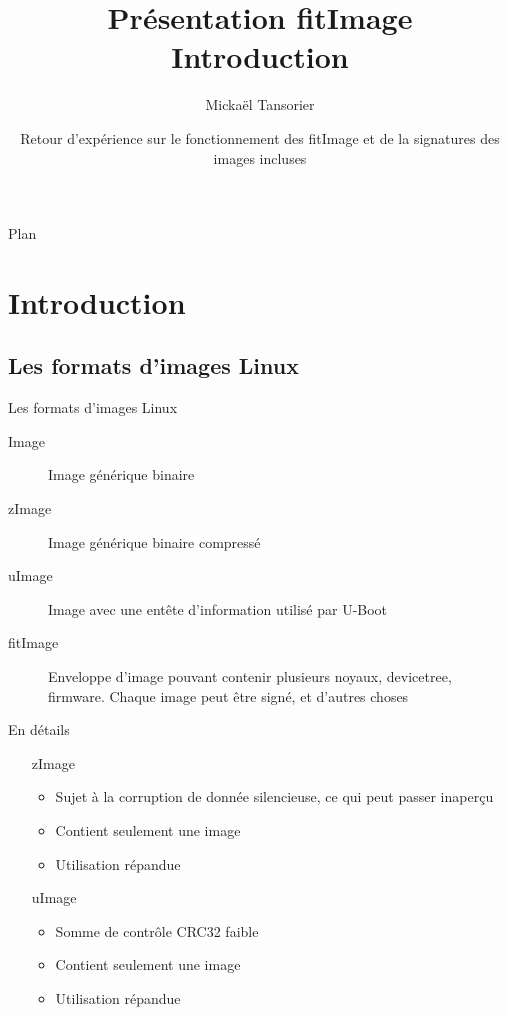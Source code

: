 \documentclass[aspectratio=169]{beamer}
\title[U-Boot]{Présentation fitImage \\ \textbf{Introduction}}
\author[Mickaël Tansorier]{Mickaël Tansorier}
\date[Août 2018]{Retour d'expérience sur le fonctionnement des fitImage et \newline de la signatures des images incluses}
\begin{document}

\begin{frame}
\titlepage
\end{frame}



\begin{frame}{Plan}
\tableofcontents[hideallsubsections]
\end{frame}

\section{Introduction}

\subsection{Les formats d'images Linux}

\begin{frame}
\begin{center}
\huge{Les formats d'images Linux}
\end{center}
\end{frame}

\begin{frame}
\begin{description}
	\item[Image] Image générique binaire
	\item[zImage] Image générique binaire compressé
	\item[uImage] Image avec une entête d'information utilisé par U-Boot
	\item[fitImage] Enveloppe d'image pouvant contenir plusieurs noyaux, devicetree, firmware. Chaque image peut être signé, et d'autres choses
\end{description}
\end{frame}

\begin{frame}{En détails}
\begin{itemize}
	\item [zImage]
	\begin{itemize}
	 	\item Sujet à la corruption de donnée silencieuse, ce qui peut passer inaperçu
	 	\item Contient seulement une image
	 	\item Utilisation répandue
	\end{itemize}
	\item [uImage]
	\begin{itemize}
		\item Somme de contrôle CRC32 faible
	 	\item Contient seulement une image
	 	\item Utilisation répandue
	\end{itemize}
\end{itemize}
\end{frame}
\end{document}
